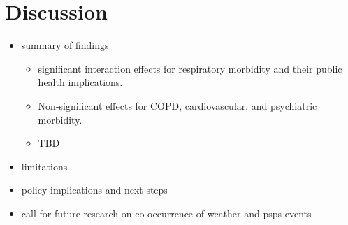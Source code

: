 \documentclass[../main.tex]{subfiles}
\begin{document}
\section{Discussion}
\begin{itemize}
    \item summary of findings 
    \begin{itemize}
        \item significant interaction effects for respiratory morbidity and their public health implications.
        \item Non-significant effects for COPD, cardiovascular, and psychiatric morbidity.
        \item TBD
    \end{itemize}
    \item limitations
    \item policy implications and next steps 
    \item call for future research on co-occurrence of weather and psps events 
    
\end{itemize}

\clearpage
\setcounter{section}{0}
\end{document}
